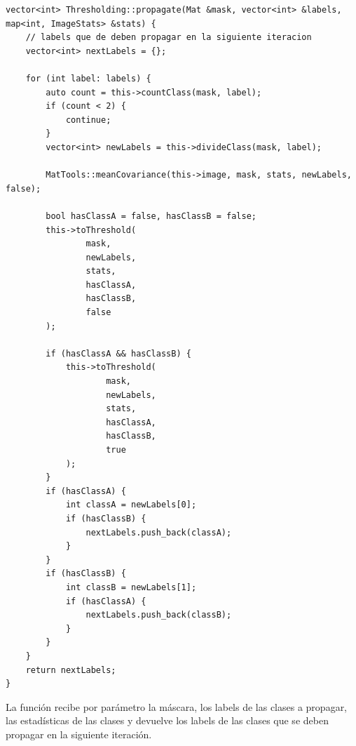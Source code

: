 \begin{lstlisting}[float=H,caption={Función propagate.},label={lst:propagation_fun}]
vector<int> Thresholding::propagate(Mat &mask, vector<int> &labels, map<int, ImageStats> &stats) {
    // labels que de deben propagar en la siguiente iteracion
    vector<int> nextLabels = {};

    for (int label: labels) {
        auto count = this->countClass(mask, label);
        if (count < 2) {
            continue;
        }
        vector<int> newLabels = this->divideClass(mask, label);

        MatTools::meanCovariance(this->image, mask, stats, newLabels, false);

        bool hasClassA = false, hasClassB = false;
        this->toThreshold(
                mask,
                newLabels,
                stats,
                hasClassA,
                hasClassB,
                false
        );

        if (hasClassA && hasClassB) {
            this->toThreshold(
                    mask,
                    newLabels,
                    stats,
                    hasClassA,
                    hasClassB,
                    true
            );
        }
        if (hasClassA) {
            int classA = newLabels[0];
            if (hasClassB) {
                nextLabels.push_back(classA);
            }
        }
        if (hasClassB) {
            int classB = newLabels[1];
            if (hasClassA) {
                nextLabels.push_back(classB);
            }
        }
    }
    return nextLabels;
}
\end{lstlisting}

La función recibe por parámetro la máscara, los labels de las clases a propagar, las estadísticas de las clases y devuelve los labels de las clases que se deben propagar en la siguiente iteración.
